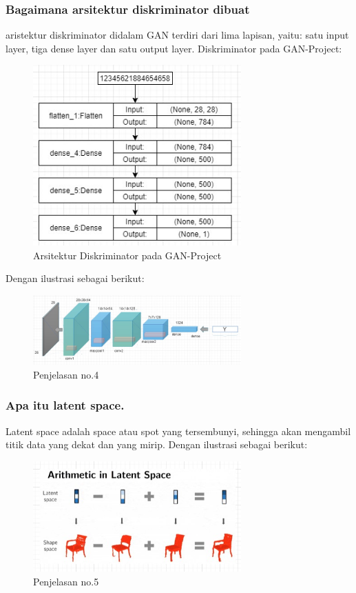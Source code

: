 \subsubsection{Bagaimana arsitektur diskriminator dibuat}
\hfill\break
aristektur diskriminator didalam GAN terdiri dari lima lapisan, yaitu: satu input layer, tiga dense layer dan satu output layer. Diskriminator pada GAN-Project:
\begin{figure}[H]
	\centering
	\includegraphics[width=8cm]{figures/1174066/8/4a.jpg}
	\caption{Arsitektur Diskriminator pada GAN-Project}
\end{figure}
Dengan ilustrasi sebagai berikut:
\begin{figure}[H]
	\centering
	\includegraphics[width=8cm]{figures/1174066/8/4.jpg}
	\caption{Penjelasan no.4}
\end{figure}

\subsubsection{Apa itu latent space.}
\hfill\break
Latent space adalah space atau spot yang tersembunyi, sehingga akan mengambil titik data yang dekat dan yang mirip.
Dengan ilustrasi sebagai berikut:
\begin{figure}[H]
	\centering
	\includegraphics[width=8cm]{figures/1174066/8/5.jpg}
	\caption{Penjelasan no.5}
\end{figure}

